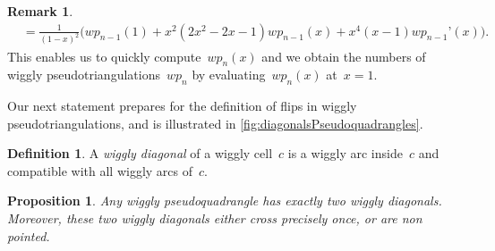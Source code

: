 \documentclass{amsart}
\newtheorem{proposition}[theorem]{Proposition}
\theoremstyle{definition}
\newtheorem{definition}[theorem]{Definition}
\newtheorem{remark}[theorem]{Remark}
\newcommand{\darkblue}{\color{darkblue}} %
\newcommand{\defn}[1]{\textsl{\darkblue #1}} %
\begin{document}
\begin{remark}
\begin{align*}
& = \frac{1}{(1 - x)^2} \big( wp_{n-1}(1) + x^2 (2 x^2 - 2 x - 1) wp_{n-1}(x) + x^4 (x - 1) wp_{n-1}’(x) \big).
\end{align*}
This enables us to quickly compute~$wp_n(x)$ and we obtain the numbers of wiggly pseudotriangulations~$wp_n$ by evaluating~$wp_n(x)$ at~$x = 1$.
\end{remark}

Our next statement prepares for the definition of flips in wiggly pseudotriangulations, and is illustrated in \cref{fig:diagonalsPseudoquadrangles}.

\begin{definition}
A \defn{wiggly diagonal} of a wiggly cell~$c$ is a wiggly arc inside~$c$ and compatible with all wiggly arcs of~$c$.
\end{definition}

\begin{proposition}
\label{prop:diagonalsPseudoquadrangle}
Any wiggly pseudoquadrangle has exactly two wiggly diagonals.
Moreover, these two wiggly diagonals either cross precisely once, or are non pointed.
\end{proposition}
\end{document}
